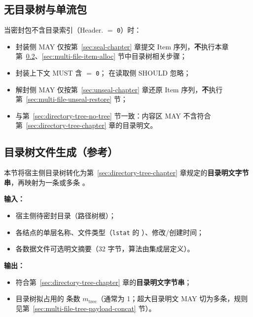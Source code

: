 \subsection{无目录树与单流包}\label{sec:multi-file-no-tree}

当密封包不含目录索引（Header. $=$ \texttt{0}）时：

\begin{itemize}
  \item 封装侧 MAY 仅按第~\ref{sec:seal-chapter} 章提交 Item 序列，\textbf{不}执行本章第~\ref{sec:multi-file-tree-generate}、\ref{sec:multi-file-item-alloc} 节中目录树相关步骤；
  \item 封装上下文 MUST 含  $=$ \texttt{0}； 在读取侧 SHOULD 忽略；
  \item 解封侧 MAY 仅按第~\ref{sec:unseal-chapter} 章还原 Item 序列，\textbf{不}执行第~\ref{sec:multi-file-unseal-restore} 节；
  \item 与第~\ref{sec:directory-tree-no-tree} 节一致：内容区 MAY 不含符合第~\ref{sec:directory-tree-chapter} 章的目录明文。
\end{itemize}

\subsection{目录树文件生成（参考）}\label{sec:multi-file-tree-generate}

本节将宿主侧目录树转化为第~\ref{sec:directory-tree-chapter} 章规定的\textbf{目录明文字节串}，再映射为一条或多条 。

\textbf{输入：}
\begin{itemize}
  \item 宿主侧待密封目录（路径树根）；
  \item 各结点的单层名称、文件类型（\texttt{lstat} 的 ）、修改/创建时间；
  \item 各数据文件可选明文摘要（32 字节，算法由集成层定义）。
\end{itemize}

\textbf{输出：}
\begin{itemize}
  \item 符合第~\ref{sec:directory-tree-chapter} 章的\textbf{目录明文字节串}；
  \item 目录树拟占用的  条数 $m_{\mathrm{tree}}$（通常为 1；超大目录明文 MAY 切为多条，规则见第~\ref{sec:multi-file-tree-payload-concat} 节）。
\end{itemize}


